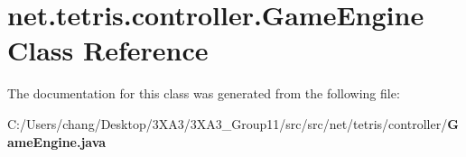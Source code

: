 \section{net.\+tetris.\+controller.\+Game\+Engine Class Reference}
\label{classnet_1_1tetris_1_1controller_1_1_game_engine}


The documentation for this class was generated from the following file\+:\begin{DoxyCompactItemize}
\item 
C\+:/\+Users/chang/\+Desktop/3\+X\+A3/3\+X\+A3\+\_\+\+Group11/src/src/net/tetris/controller/{\bf Game\+Engine.\+java}\end{DoxyCompactItemize}
